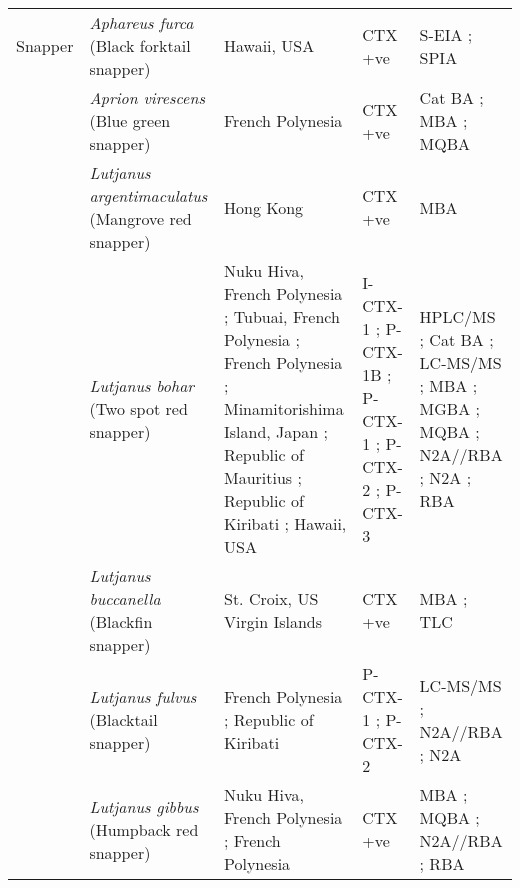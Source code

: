 \documentclass[12pt]{article}
\begin{document}
\begin{longtable}[l]{ | p{2cm} | p{3cm} | p{4.5cm} | p{2cm} | p{3cm} | }
	\hline
	Snapper & \emph{Aphareus furca} (Black forktail snapper) & Hawaii, USA \cite{hokama1990simplified} & CTX +ve \cite{hokama1990simplified} & S-EIA \cite{hokama1990simplified}; SPIA \cite{hokama1990simplified} \\
	& \emph{Aprion virescens} (Blue green snapper) & French Polynesia \cite{bagnis1987use} & CTX +ve \cite{bagnis1987use} & Cat BA \cite{bagnis1987use}; MBA \cite{bagnis1987use}; MQBA \cite{bagnis1987use} \\
	& \emph{Lutjanus argentimaculatus} (Mangrove red snapper) & Hong Kong \cite{wong2008features} & CTX +ve \cite{wong2008features} & MBA \cite{wong2008features} \\
	& \emph{Lutjanus bohar} (Two spot red snapper) & Nuku Hiva, French Polynesia \cite{darius2007ciguatera}; Tubuai, French Polynesia \cite{darius2007ciguatera}; French Polynesia \cite{bagnis1987use,chinain2014mail}; Minamitorishima Island, Japan \cite{yogi2011detailed}; Republic of Mauritius \cite{hamilton2002multiple,hamilton2002isolation}; Republic of Kiribati \cite{mak2013pacific}; Hawaii, USA \cite{hokama1990simplified} & I-CTX-1 \cite{hamilton2002multiple,hamilton2002isolation}; P-CTX-1B \cite{yogi2011detailed}; P-CTX-1 \cite{mak2013pacific}; P-CTX-2 \cite{mak2013pacific}; P-CTX-3 \cite{mak2013pacific} & HPLC/MS \cite{hamilton2002multiple,hamilton2002isolation}; Cat BA \cite{bagnis1987use}; LC-MS/MS \cite{yogi2011detailed,mak2013pacific}; MBA \cite{hamilton2002multiple,bagnis1987use,hamilton2002isolation}; MGBA \cite{hamilton2002multiple,hamilton2002isolation}; MQBA \cite{bagnis1987use}; N2A//RBA \cite{chinain2014mail}; N2A \cite{mak2013pacific}; RBA \cite{darius2007ciguatera} \\
	& \emph{Lutjanus buccanella} (Blackfin snapper) & St. Croix, US Virgin Islands \cite{hoffman1983mouse} & CTX +ve \cite{hoffman1983mouse} & MBA \cite{hoffman1983mouse}; TLC \cite{hoffman1983mouse} \\
	& \emph{Lutjanus fulvus} (Blacktail snapper) & French Polynesia \cite{chinain2014mail}; Republic of Kiribati \cite{mak2013pacific} & P-CTX-1 \cite{mak2013pacific}; P-CTX-2 \cite{mak2013pacific} & LC-MS/MS \cite{mak2013pacific}; N2A//RBA \cite{chinain2014mail}; N2A \cite{mak2013pacific} \\
	& \emph{Lutjanus gibbus} (Humpback red snapper) & Nuku Hiva, French Polynesia \cite{darius2007ciguatera}; French Polynesia \cite{bagnis1987use,chinain2014mail} & CTX +ve \cite{darius2007ciguatera,bagnis1987use,chinain2014mail} & MBA \cite{bagnis1987use}; MQBA \cite{bagnis1987use}; N2A//RBA \cite{chinain2014mail}; RBA \cite{darius2007ciguatera} \\

\end{longtable}
\end{document}
